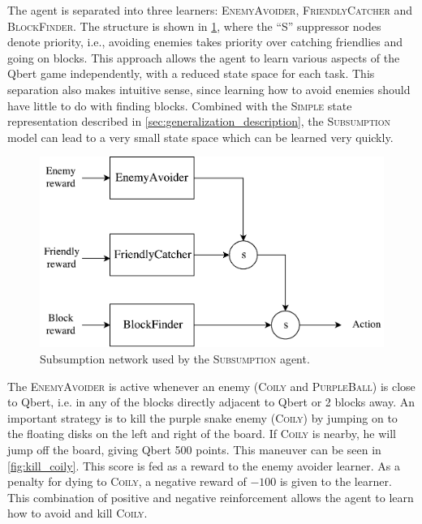 \documentclass[a4paper,titlepage]{article}
\begin{document}
	The agent is separated into three learners: \textsc{EnemyAvoider}, \textsc{FriendlyCatcher} and \textsc{BlockFinder}. The structure is shown in \cref{fig:subsumption}, where the ``S'' suppressor nodes denote priority, i.e., avoiding enemies takes priority over catching friendlies and going on blocks. This approach allows the agent to learn various aspects of the Qbert game independently, with a reduced state space for each task. This separation also makes intuitive sense, since learning how to avoid enemies should have little to do with finding blocks. Combined with the \textsc{Simple} state representation described in \cref{sec:generalization_description}, the \textsc{Subsumption} model can lead to a very small state space which can be learned very quickly.
	
	\begin{figure}[!htb]
		\centering
		\includegraphics[width=\columnwidth]{plots/subsumption.pdf}
		\caption
		{Subsumption network used by the \textsc{Subsumption} agent.}
		\label{fig:subsumption}
	\end{figure}

	The \textsc{EnemyAvoider} is active whenever an enemy (\textsc{Coily} and \textsc{PurpleBall}) is close to Qbert, i.e. in any of the blocks directly adjacent to Qbert or 2 blocks away. An important strategy is to kill the purple snake enemy (\textsc{Coily}) by jumping on to the floating disks on the left and right of the board. If \textsc{Coily} is nearby, he will jump off the board, giving Qbert 500 points. This maneuver can be seen in \cref{fig:kill_coily}. This score is fed as a reward to the enemy avoider learner. As a penalty for dying to \textsc{Coily}, a negative reward of $-100$ is given to the learner. This combination of positive and negative reinforcement allows the agent to learn how to avoid and kill \textsc{Coily}.
	
\end{document}
